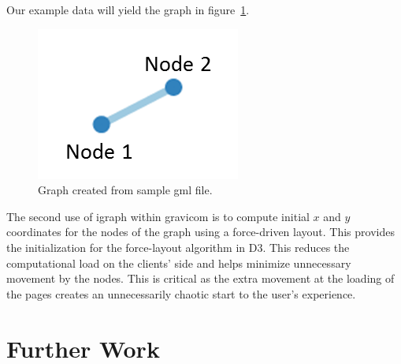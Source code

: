\documentclass{article}\usepackage[]{graphicx}\usepackage[]{color}
\begin{document}
Our example data will yield the graph in figure~\ref{fig:samplegraph}.

\begin{figure}[hbtp]
\centering
\includegraphics{images/samplegraph.png}
\caption{\label{fig:samplegraph} Graph created from sample gml file.}
\end{figure}
The second use of igraph within gravicom is to compute initial $x$ and $y$ coordinates for the nodes of the graph using a force-driven layout. This provides the initialization for the force-layout algorithm in D3. This reduces the computational load on the clients' side and helps minimize unnecessary movement by the nodes. This is critical as the extra movement at the loading of the pages creates an unnecessarily chaotic start to the user's experience. 




\section{Further Work}

\printbibliography
\end{document}
